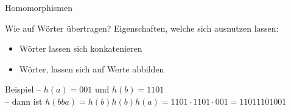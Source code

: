 \begin{frame}{Homomorphismen}
    \begin{block}{Wie auf Wörter übertragen?}
        Eigenschaften, welche sich ausnutzen lassen:\\
        \begin{itemize}
            \item Wörter lassen sich konkatenieren
            
            \item Wörter, lassen sich auf Werte abbilden
        \end{itemize}
    \end{block}
    
    \pause		
    
    \begin{exampleblock}{Beispiel}
        -- $h(a) = 001$ und $h(b) = 1101$\\
        -- dann ist $h(bba) = h(b)h(b)h(a) = 1101 \cdot 1101 \cdot 001 = 11011101001$\\
        \vspace{10pt}
    \end{exampleblock}
\end{frame}

